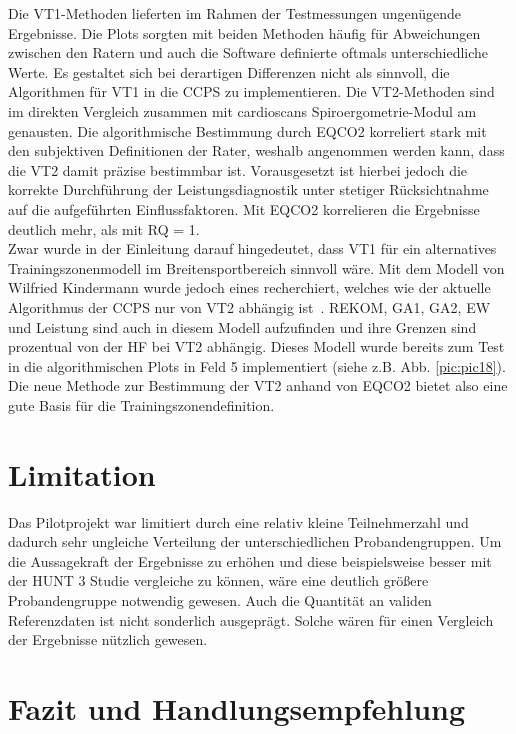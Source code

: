 Die VT1-Methoden lieferten im Rahmen der Testmessungen ungenügende Ergebnisse. Die Plots sorgten mit beiden Methoden häufig für Abweichungen zwischen den Ratern und auch die Software definierte oftmals unterschiedliche Werte. Es gestaltet sich bei derartigen Differenzen nicht als sinnvoll, die Algorithmen für VT1 in die \acs{CCPS} zu implementieren. Die VT2-Methoden sind im direkten Vergleich zusammen mit cardioscans Spiroergometrie-Modul am genausten. Die algorithmische Bestimmung durch \acs{EQCO2} korreliert stark mit den subjektiven Definitionen der Rater, weshalb angenommen werden kann, dass die VT2 damit präzise bestimmbar ist. Vorausgesetzt ist hierbei jedoch die korrekte Durchführung der Leistungsdiagnostik unter stetiger Rücksichtnahme auf die aufgeführten Einflussfaktoren. Mit \acs{EQCO2} korrelieren die Ergebnisse deutlich mehr, als mit RQ = 1.\\
Zwar wurde in der Einleitung darauf hingedeutet, dass VT1 für ein alternatives Trainingszonenmodell im Breitensportbereich sinnvoll wäre. Mit dem Modell von Wilfried Kindermann wurde jedoch eines recherchiert, welches wie der aktuelle Algorithmus der \acs{CCPS} nur von VT2 abhängig ist~\cite{Kindermann.2004}. \acs{REKOM}, \acs{GA1}, \acs{GA2}, \acs{EW} und Leistung sind auch in diesem Modell aufzufinden und ihre Grenzen sind prozentual von der \acs{HF} bei VT2 abhängig. Dieses Modell wurde bereits zum Test in die algorithmischen Plots in Feld 5 implementiert (siehe z.B. Abb. \ref{pic:pic18}). Die neue Methode zur Bestimmung der VT2 anhand von \acs{EQCO2} bietet also eine gute Basis für die Trainingszonendefinition.

\section{Limitation}

Das Pilotprojekt war limitiert durch eine relativ kleine Teilnehmerzahl und dadurch sehr ungleiche Verteilung der unterschiedlichen Probandengruppen. Um die Aussagekraft der Ergebnisse zu erhöhen und diese beispielsweise besser mit der HUNT 3 Studie vergleiche zu können, wäre eine deutlich größere Probandengruppe notwendig gewesen. Auch die Quantität an validen Referenzdaten ist nicht sonderlich ausgeprägt. Solche wären für einen Vergleich der Ergebnisse nützlich gewesen. 

\section{Fazit und Handlungsempfehlung}

